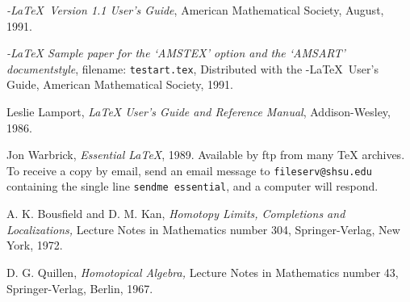 \begin{thebibliography}{10}


{\em \AmS-\LaTeX\ Version 1.1 User's Guide}, American Mathematical
Society, August, 1991.

{\em \AmS-\LaTeX{} Sample paper for the `AMSTEX' option and the
`AMSART' documentstyle}, filename: {\tt testart.tex}, Distributed
with the \AmS-\LaTeX\ User's Guide, American Mathematical Society,
1991.

Leslie Lamport,
{\em \LaTeX{} User's Guide and Reference Manual}, Addison-Wesley,
1986.

Jon Warbrick, {\em Essential \LaTeX}, 1989.  Available by ftp from
many \TeX{} archives.  To receive a copy by email, send an email
message to \verb"fileserv@shsu.edu" containing the single line
\verb"sendme essential", and a computer will respond.

A. K. Bousfield and D. M. Kan, {\em Homotopy Limits, Completions
and Localizations,} Lecture Notes in Mathematics number 304,
Springer-Verlag, New York, 1972.

D. G. Quillen, {\em Homotopical Algebra,} Lecture Notes in
Mathematics number 43, Springer-Verlag, Berlin, 1967.


\end{thebibliography}

